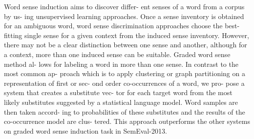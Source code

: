 Word sense induction aims to discover differ- ent senses of a word from a corpus by us-
 ing unsupervised learning approaches. Once a
 sense inventory is obtained for an ambiguous
 word, word sense discrimination approaches
 choose the best-fitting single sense for a given
 context from the induced sense inventory.
 However, there may not be a clear distinction
 between one sense and another, although for
 a context, more than one induced sense can
 be suitable. Graded word sense method al-
 lows for labeling a word in more than one
 sense. In contrast to the most common ap-
 proach which is to apply clustering or graph
 partitioning on a representation of first or sec-
 ond order co-occurrences of a word, we pro-
 pose a system that creates a substitute vec-
 tor for each target word from the most likely
 substitutes suggested by a statistical language
 model. Word samples are then taken accord-
 ing to probabilities of these substitutes and the
 results of the co-occurrence model are clus-
 tered. This approach outperforms the other
 systems on graded word sense induction task
 in SemEval-2013.

